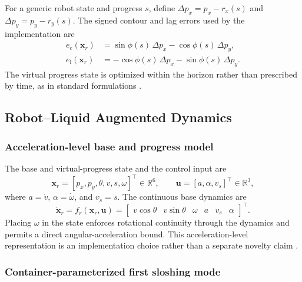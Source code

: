 For a generic robot state and progress \(s\), define
\(\Delta p_x=p_x-r_x(s)\) and \(\Delta p_y=p_y-r_y(s)\). The signed contour
and lag errors used by the implementation are
\begin{equation}
\begin{aligned}
  e_{\mathrm c}(\bm x_r)
  &=\sin\phi(s)\,\Delta p_x-\cos\phi(s)\,\Delta p_y,\\
  e_{\mathrm l}(\bm x_r)
  &=-\cos\phi(s)\,\Delta p_x-\sin\phi(s)\,\Delta p_y.
\end{aligned}
\label{eq:contour_lag_errors}
\end{equation}
The virtual progress state is optimized within the horizon rather than prescribed by time, as in standard \MPCC{} formulations \cite{D19_Liniger2015,D20_Brito2019}.

\subsection{Robot--Liquid Augmented Dynamics}

\subsubsection{Acceleration-level base and progress model}

The base and virtual-progress state and the control input are
\begin{equation}
  \bm x_r
  =[p_x,p_y,\theta,v,s,\omega]^\top\in\mathbb R^6,
  \qquad
  \bm u=[a,\alpha,v_s]^\top\in\mathbb R^3,
  \label{eq:robot_state_control}
\end{equation}
where \(a=\dot v\), \(\alpha=\dot\omega\), and \(v_s=\dot s\). The continuous
base dynamics are
\begin{equation}
  \dot{\bm x}_r
  =f_r(\bm x_r,\bm u)
  =
  \begin{bmatrix}
    v\cos\theta&
    v\sin\theta&
    \omega&
    a&
    v_s&
    \alpha
  \end{bmatrix}^{\!\top}.
\label{eq:robot_dynamics}
\end{equation}
Placing $\omega$ in the state enforces rotational continuity through the dynamics and permits a direct angular-acceleration bound. This acceleration-level representation is an implementation choice rather than a separate novelty claim \cite{D23_Arrizabalaga2021}.

\subsubsection{Container-parameterized first sloshing mode}

